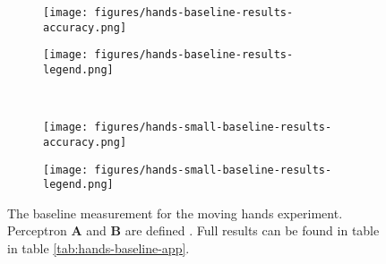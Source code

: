 \begin{figure}
    \centering
    \begin{subfigure}{0.5\linewidth}
        \centering
        \captionsetup{width = 0.9\linewidth}
        \texttt{[image: figures/hands-baseline-results-accuracy.png]}
    \end{subfigure}%
    \begin{subfigure}{0.5\linewidth}
        \centering
        \captionsetup{width = 0.9\linewidth}
        \texttt{[image: figures/hands-baseline-results-legend.png]}
    \end{subfigure}%
    \\
    \begin{subfigure}{0.5\linewidth}
        \centering
        \captionsetup{width = 0.9\linewidth}
        \texttt{[image: figures/hands-small-baseline-results-accuracy.png]}
    \end{subfigure}%
    \begin{subfigure}{0.5\linewidth}
        \centering
        \captionsetup{width = 0.9\linewidth}
        \texttt{[image: figures/hands-small-baseline-results-legend.png]}
    \end{subfigure}%
    \caption{The baseline measurement for the moving hands experiment. Perceptron \textbf{A} and \textbf{B} are defined . Full results can be found in table in table \ref{tab:hands-baseline-app}.}
    \label{fig:hands-baseline-results}
\end{figure}

